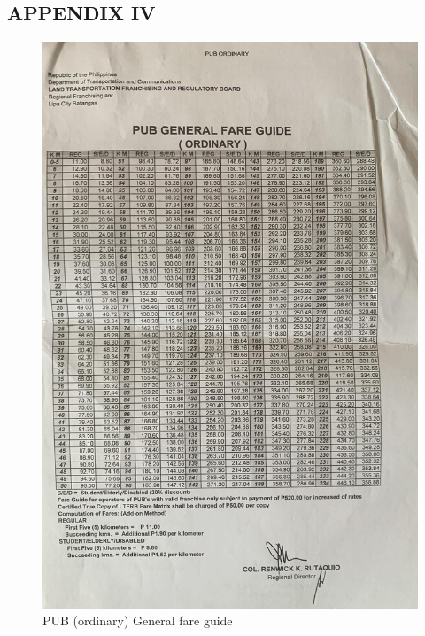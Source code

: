\documentclass{icsthesis}
\begin{document}
\begin{mainmatter}
\section{APPENDIX IV}
\begin{figure}[!h]
    \centering
        \includegraphics[scale=0.25]{./figures/ltfrb/pub ordinary.jpeg}
    \caption{PUB (ordinary) General fare guide}
\end{figure}

			
	\end{mainmatter}
\end{document}
